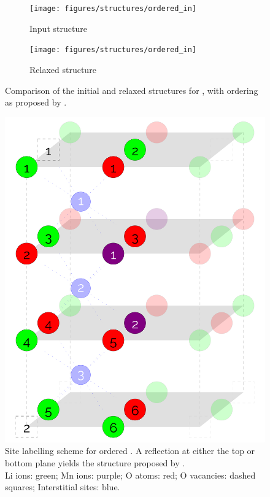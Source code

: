 \begin{figure}[p]
\centering

\begin{subfigure}{0.5\textwidth}
\centering
\texttt{[image: figures/structures/ordered\_in]}
\caption{Input structure\cite{Diaz-Lopez2017}}
\end{subfigure}%
\begin{subfigure}{0.5\textwidth}
\centering
\texttt{[image: figures/structures/ordered\_in]}
\caption{Relaxed structure}
\end{subfigure}

\caption[Comparison of the initial and relaxed structures for ordered ]{Comparison of the initial and relaxed structures for , with ordering as proposed by \citet{Diaz-Lopez2017}.}
\end{figure}

\newpage
\begin{figure}[h]
\centering
\includegraphics[height = 0.55\textheight]{figures/orderedlabels/orderedlabels}
\caption[Site labelling scheme for ordered ]{Site labelling scheme for ordered . A reflection at either the top or bottom plane yields the structure proposed by \citet{Diaz-Lopez2017}. \\Li ions: green; Mn ions: purple; O atoms: red; O vacancies: dashed squares; Interstitial sites: blue.
}
\label{fig:orderedlabel}
\end{figure}

